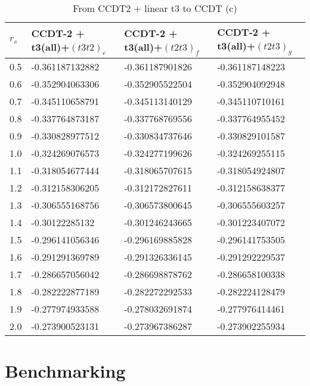 \begin{table}[h]
\caption{From CCDT2 + linear t3 to CCDT (c)}
\begin{center}
\begin{threeparttable}
\begin{tabular}{l l l l}
    \toprule
$r_s$ & CCDT-2 + t3(all)+$(t3t2)_e$ & CCDT-2 + t3(all)+$(t2t3)_f$ & CCDT-2 + t3(all)+$(t2t3)_g$  \\ \hline
0.5 & -0.361187132882 & -0.361187901826 & -0.361187148223   \\
0.6 & -0.352904063306 & -0.352905522504 & -0.352904092948   \\
0.7 & -0.345110658791 & -0.345113140129 & -0.345110710161   \\
0.8 & -0.337764873187 & -0.337768769556 & -0.337764955452   \\
0.9 & -0.330828977512 & -0.330834737646 & -0.330829101587   \\
1.0 & -0.324269076573 & -0.324277199626 & -0.324269255115   \\
1.1 & -0.318054677444 & -0.318065707615 & -0.318054924807   \\
1.2 & -0.312158306205 & -0.312172827611 & -0.312158638377   \\
1.3 & -0.306555168756 & -0.306573800645 & -0.306555603257   \\
1.4 & -0.30122285132 & -0.301246243665 & -0.301223407072   \\
1.5 & -0.296141056346 & -0.296169885828 & -0.296141753505   \\
1.6 & -0.291291369789 & -0.291326336145 & -0.291292229537   \\
1.7 & -0.286657056042 & -0.286698878762 & -0.286658100338   \\
1.8 & -0.282222877189 & -0.282272292533 & -0.282224128479   \\
1.9 & -0.277974933588 & -0.278032691874 & -0.277976414461   \\
2.0 & -0.273900523131 & -0.273967386287 & -0.273902255934   \\
\bottomrule
\end{tabular}
\begin{tablenotes}
\end{tablenotes}
\end{threeparttable}
\end{center}
\label{tab:ccdt3_to_ccdt_3}
\end{table}

\FloatBarrier

\section{Benchmarking}

